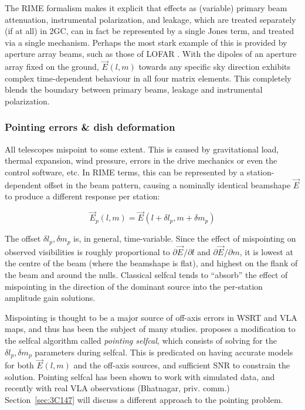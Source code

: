 \documentclass[]{aa}
\newcommand{\jones}[2]{\vec {#1}_{#2}}
\begin{document}
The RIME formalism makes it explicit that effects as (variable) primary beam attenuation, instrumental polarization, and leakage, which are treated separately (if at all) in 2GC, can in fact be represented by a single Jones term, and treated via a single mechanism. Perhaps the most stark example of this is provided by aperture array beams, such as those of LOFAR \citep{Yatawatta:LOFAR-beam}. With the dipoles of an aperture array fixed on the ground, 
$\jones{E}{}(l,m)$ towards any specific sky direction exhibits complex time-dependent behaviour in all four matrix elements. This completely blends the boundary between primary beams, leakage and instrumental polarization.

\subsubsection{Pointing errors \& dish deformation\label{sec:pointing}}

All telescopes mispoint to some extent. This is caused by gravitational load, thermal expansion, wind pressure, errors in the drive mechanics or even the control software, etc. In RIME terms, this can be represented by a station-dependent offset in the beam pattern, causing a nominally identical beamshape $\jones{E}{}$ to produce a different response per station:

\begin{equation}\label{eq:mispointing}
\jones{E}{p}(l,m) = \jones{E}{}(l+\delta l_p,m+\delta m_p)
\end{equation}

The offset $\delta l_p,\delta m_p$ is, in general, time-variable. Since the effect of mispointing on observed visibilities is roughly proportional to $\partial\jones{E}{}/\partial l$ and $\partial \jones{E}{}/\partial m$, it is lowest at the centre of the beam (where the beamshape is flat), and highest on the flank of the beam and around the nulls. Classical selfcal tends to  ``absorb'' the effect of mispointing in the direction of the dominant source
into the per-station amplitude gain solutions. 

Mispointing is thought to be a major source of off-axis errors in WSRT and VLA maps, and thus has been the subject of many studies. \citet{SB:pointing} proposes a modification to the selfcal algorithm called {\em pointing selfcal}, which consists of solving for the $\delta l_p,\delta m_p$ parameters during selfcal. This is predicated on having accurate models for both $\jones{E}{}(l,m)$ and the off-axis sources, and sufficient SNR to constrain the solution. Pointing selfcal has been shown to work with simulated data, and recently with real VLA observations (Bhatnagar, priv. comm.) Section~\ref{sec:3C147} will discuss a different approach to the pointing problem.
\end{document}
